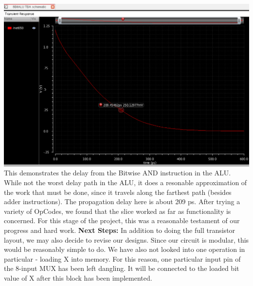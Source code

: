 \documentclass[12pt]{article}
\begin{document}
  \\
  \includegraphics[scale=0.4]{AndDelay.png}
  \\

  This demonstrates the delay from the Bitwise AND instruction in the ALU. While not the worst delay
  path in the ALU, it does a resonable approximation of the work that must be done, since
  it travels along the farthest path (besides adder instructions). The propagation delay
  here is about 209 ps.
	\newline \newline
	After trying a variety of OpCodes, we found that the slice worked as far as functionality 
	is concerned. For this stage of the project, this was a reasonable testament of our progress
	and hard work.
	\newline \newline
	\textbf{Next Steps:}
	\newline \newline
	In addition to doing the full transistor layout, we may also decide to revise our designs. Since
	our circuit is modular, this would be reasonably simple to do. We have also not looked into
	one operation in particular - loading X into memory. For this reason, one particular input pin 
	of the 8-input MUX has been left dangling. It will be connected to the loaded bit value of
	X after this block has been implemented. 
\end{document}
